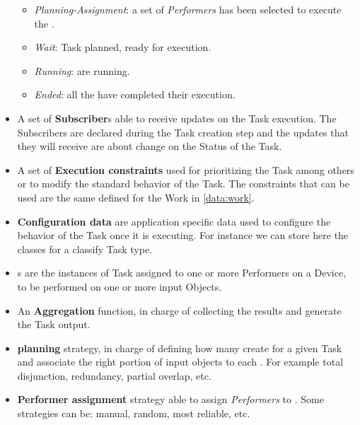\begin{itemize}
\begin{itemize}
            \item \emph{Planning-Assignment}: a set of \emph{Performers} has
            been selected to execute the \utask{}.
            
            \item \emph{Wait}: Task planned, \utask{} ready for execution.
            
            \item \emph{Running}: \utask{} are running.
            
            \item \emph{Ended}: all the \utask{} have completed their execution.
        \end{itemize}
    
    \item A set of \textbf{Subscriber}s able to receive updates on the Task
    execution. The Subscribers are declared during the Task creation step and the
    updates that they will receive are about change on the Status of the Task.

    \item A set of \textbf{Execution constraints} used for prioritizing the Task
    among others or to modify the standard behavior of the Task. The constraints
    that can be used are the same defined for the Work in \ref{data:work}.

    \item \textbf{Configuration data} are application specific data used to
    configure the behavior of the Task once it is executing. For instance
    we can store here the classes for a classify Task type.

    \item \textbf{\utask{}}s are the instances of Task assigned to one or more
    Performers on a Device, to be performed on one or more input Objects.

    \item An \textbf{Aggregation} function, in charge of collecting the \utask{}
    results and generate the Task output.
    
    \item \textbf{\utask{} planning} strategy, in charge of defining how many
    \utask{} create for a given Task and associate the right portion of input
    objects to each \utask{}. For example total disjunction, redundancy, partial
    overlap, etc.
    
    \item \textbf{Performer assignment} strategy able to assign \emph{Performers}
    to \utask{}. Some strategies can be: manual, random, most reliable, etc.


\end{itemize}

